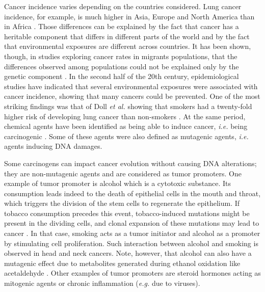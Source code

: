 Cancer incidence varies depending on the countries considered. Lung cancer incidence, for example, is much higher in Asia, Europe and North America than in Africa \cite{globocan_lung}. Those differences can be explained by the fact that cancer has a heritable component that differs in different parts of the world and by the fact that environmental exposures are different across countries. %
It has been shown, though, in studies exploring cancer rates in migrants populations, that the differences observed among populations could not be explained only by the genetic component \cite{Peto2001}.  
In the second half of the 20th century, epidemiological studies have indicated that several environmental exposures were associated with cancer incidence, showing that many cancers could be prevented. One of the most striking findings was that of Doll \textit{et al.} showing that smokers had a twenty-fold higher risk of developing lung cancer than non-smokers \cite{Doll1950}. At the same period, chemical agents have been identified as being able to induce cancer, \textit{i.e.} being carcinogenic \cite{Loeb2008}. Some of these agents were also defined as mutagenic agents, \textit{i.e.} agents inducing \gls*{DNA} damages. 

Some carcinogens can impact cancer evolution without causing \gls*{DNA} alterations; they are non-mutagenic agents and are considered as tumor promoters. One example of tumor promoter is alcohol which is a cytotoxic substance. %
Its consumption leads indeed to the death of epithelial cells in the mouth and throat, which triggers the division of the stem cells to regenerate the epithelium. If tobacco consumption precedes this event, tobacco-induced mutations might be present in the dividing cells, and clonal expansion of these mutations may lead to cancer \cite{Weinberg2014}. In that case, smoking acts as a tumor initiator and alcohol as a promoter by stimulating cell proliferation. Such interaction between alcohol and smoking is observed in head and neck cancers. Note, however, that alcohol can also have a mutagenic effect due to metabolites generated during ethanol oxidation like acetaldehyde \cite{Seitz2010}. Other examples of tumor promoters are steroid hormones acting as mitogenic agents or chronic inflammation (\textit{e.g.} due to viruses). 


